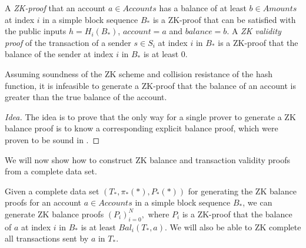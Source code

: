 \begin{defn}
  A \emph{ZK-proof} that an account \(a \in Accounts\) has a balance of at least \(b \in Amounts\) at index \(i\) in a simple block sequence \(B_*\) is a ZK-proof that  can be satisfied with the public inputs \(h=H_i(B_*)\), \(account=a\) and \(balance=b\). A \emph{ZK validity proof} of the transaction of a sender \(s \in S_i\) at index \(i\) in \(B_*\) is a ZK-proof that the balance of the sender at index \(i\) in \(B_*\) is at least 0.
\end{defn}

\begin{theorem}\label{theorem:zkp-proof-soundness}
 Assuming soundness of the ZK scheme and collision resistance of the hash function, it is infeasible to generate a ZK-proof that the balance of an account is greater than the true balance of the account.
\end{theorem}

\begin{proof}[Idea]
  The idea is to prove that the only way for a single prover to generate a ZK balance proof is to know a corresponding explicit balance proof, which were proven to be sound in .
\end{proof}

We will now show how to construct ZK balance and transaction validity proofs from a complete data set.

\begin{theorem}\label{theorem:zk-proof-of-balance-in-honest-transaction-map-sequence}
  Given a complete data set \((T_*,\pi_*(*), P_*(*))\) for generating the ZK balance proofs for an account \(a \in Accounts\) in a simple block sequence \(B_*\), we can generate ZK balance proofs \((P_i)_{i=0}^N,\) where \(P_i\) is a ZK-proof that the balance of \(a\) at index \(i\) in \(B_*\) is at least \(Bal_i(T_*,a)\). We will also be able to ZK complete all transactions sent by \(a\) in \(T_*\).
\end{theorem}


